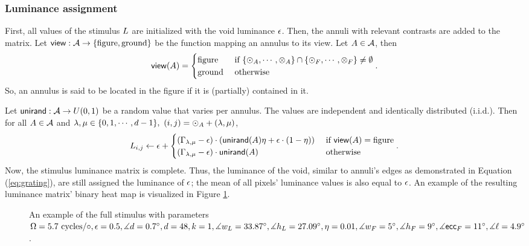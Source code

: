 \subsubsection{Luminance assignment}
\label{sec:luminance-assignment}

First, all values of the stimulus $L$ are initialized with the void luminance $\epsilon$. Then, the annuli with relevant contrasts are added to the matrix. Let $\mathsf{view}: \mathcal{A} \to \{ \mathrm{figure}, \mathrm{ground} \}$ be the function mapping an annulus to its view. Let $A \in \mathcal{A}$, then
\begin{equation}
    \mathsf{view}(A) = 
    \begin{cases}
        \mathrm{figure} & \text{ if } 
        \{ \odot_A, \cdots,  \otimes_A \}
        \cap
        \{ \odot_F, \cdots, \otimes_F \}
        \neq \emptyset \\
        \mathrm{ground} & \text{ otherwise} 
    \end{cases}.
\end{equation}
So, an annulus is said to be located in the figure if it is (partially) contained in it.

Let $\mathsf{unirand}: \mathcal{A} \to U(0, 1)$ be a random value that varies per annulus. The values are independent and identically distributed (i.i.d.). Then for all $A \in \mathcal{A}$ and $\lambda, \mu \in \{ 0, 1, \cdots, \diam - 1\}, \ (i, j) = \annstart_\annstimmatrix + (\lambda, \mu)$,
\begin{equation}
    L_{i, j} \leftarrow \epsilon +
    \begin{cases}
        (\Gamma_{\lambda, \mu} - \epsilon) \cdot \left( \mathsf{unirand}(A) \eta + \epsilon \cdot (1 - \eta) \right) 
        &\text{ if } \mathsf{view}(A) = \mathrm{figure}  \\
        (\Gamma_{\lambda, \mu} - \epsilon) \cdot \mathsf{unirand}(A) 
        &\text{ otherwise}
    \end{cases}.
\end{equation}
Now, the stimulus luminance matrix is complete.
Thus, the luminance of the void, similar to annuli's edges as demonstrated in Equation (\ref{eq:grating}), are still assigned the luminance of $\epsilon$; the mean of all pixels' luminance values is also equal to $\epsilon$. An example of the resulting luminance matrix' binary heat map is visualized in Figure \ref{fig:full-stimulus-example}.

\begin{figure}[!htp]
    \centering
    
    \caption{An example of the full stimulus with parameters $ \Omega = 5.7 \text{ cycles}/\circ, \epsilon = 0.5, \measuredangle d = 0.7^\circ, d = 48, k = 1, \measuredangle w_L = 33.87^\circ, \measuredangle h_L = 27.09^\circ, \eta = 0.01, \measuredangle w_F = 5^\circ, \measuredangle h_F = 9^\circ, \measuredangle \mathsf{ecc}_F = 11^\circ, \measuredangle \ell = 4.9^\circ$.}
    \label{fig:full-stimulus-example}
\end{figure}